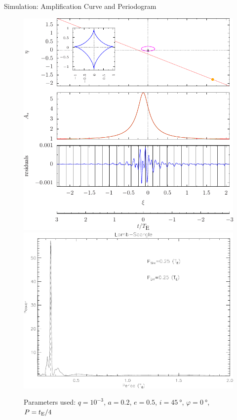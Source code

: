 \documentclass[final,hyperref={pdfpagelabels=false}]{beamer}
\renewcommand{\phi}{\varphi}
\begin{document}
\begin{frame}
\begin{columns}
\begin{column}{0.48\textwidth}
\begin{minipage}[T]{\columnwidth}
        \begin{block}{Simulation: Amplification Curve and Periodogram}
          \begin{figure}
            \centering
            \includegraphics[width=0.775\columnwidth]{figures/figure2}\\[1.8ex]
            \includegraphics[width=0.775\columnwidth]{figures/lombscargle2}
            \caption{Parameters used: \(q = 10^{-3}\), \(a = 0.2\), \(e = 0.5\),
              \(i = \SI{45}{\degree}\), \(\phi = \SI{0}{\degree}\), \(P =
              t_{\textup{E}}/4\)}
            \vspace{-0.5em}
          \end{figure}
        \end{block}


\end{minipage}
\end{column}
\end{columns}
\end{frame}
\end{document}
